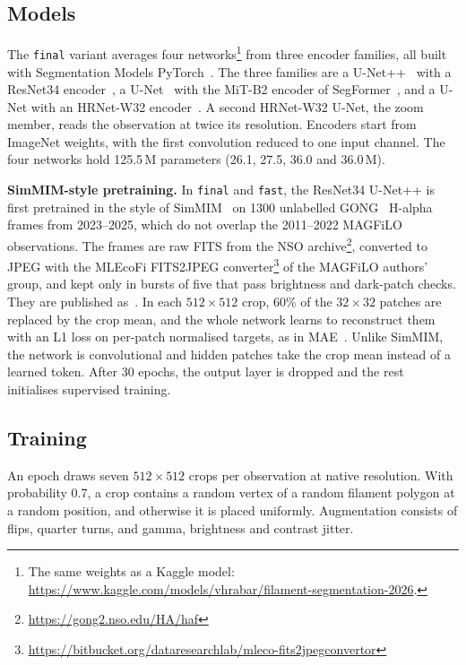 \documentclass[sigconf,pbalance]{acmart}
\begin{document}
    \subsection{Models}\label{subsec:models}
    The \texttt{final} variant averages four networks\footnote{The same weights as a Kaggle model: \url{https://www.kaggle.com/models/vhrabar/filament-segmentation-2026}.} from three encoder families, all built with Segmentation Models PyTorch~\cite{iakubovskii2019smp}.
    The three families are a U-Net++~\cite{zhou2018unetpp} with a ResNet34 encoder~\cite{he2016resnet}, a U-Net~\cite{ronneberger2015unet} with the MiT-B2 encoder of SegFormer~\cite{xie2021segformer}, and a U-Net with an HRNet-W32 encoder~\cite{wang2021hrnet}.
    A second HRNet-W32 U-Net, the zoom member, reads the observation at twice its resolution.
    Encoders start from ImageNet weights, with the first convolution reduced to one input channel.
    The four networks hold 125.5\,M parameters (26.1, 27.5, 36.0 and 36.0\,M).

    \textbf{SimMIM-style pretraining.} In \texttt{final} and \texttt{fast}, the ResNet34 U-Net++ is first pretrained in the style of SimMIM~\cite{xie2022simmim} on 1300 unlabelled GONG~\cite{harvey1996gong} H-alpha frames from 2023--2025, which do not overlap the 2011--2022 MAGFiLO observations.
    The frames are raw FITS from the NSO archive\footnote{\url{https://gong2.nso.edu/HA/haf}}, converted to JPEG with the MLEcoFi FITS2JPEG converter\footnote{\url{https://bitbucket.org/dataresearchlab/mleco-fits2jpegconvertor}} of the MAGFiLO authors' group, and kept only in bursts of five that pass brightness and dark-patch checks.
    They are published as~\cite{vedran_hrabar_2026}.
    In each $512\times512$ crop, 60\% of the $32\times32$ patches are replaced by the crop mean, and the whole network learns to reconstruct them with an L1 loss on per-patch normalised targets, as in MAE~\cite{he2022mae}.
    Unlike SimMIM, the network is convolutional and hidden patches take the crop mean instead of a learned token.
    After 30 epochs, the output layer is dropped and the rest initialises supervised training.

    \subsection{Training}\label{subsec:training}
    An epoch draws seven $512\times512$ crops per observation at native resolution.
    With probability 0.7, a crop contains a random vertex of a random filament polygon at a random position, and otherwise it is placed uniformly.
    Augmentation consists of flips, quarter turns, and gamma, brightness and contrast jitter.
\end{document}
